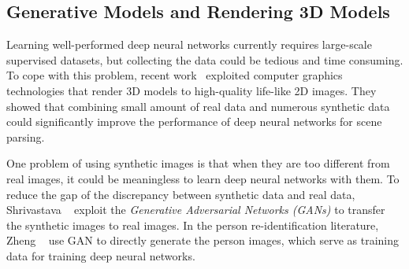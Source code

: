 {\subsection{Generative Models and Rendering 3D Models} %
\label{sub:human-id-generative-models}
Learning well-performed deep neural networks currently requires large-scale supervised datasets, but collecting the data could be tedious and time consuming. To cope with this problem, recent work~\cite{richter2016playing,chen2017photographic} exploited computer graphics technologies that render 3D models to high-quality life-like 2D images. They showed that combining small amount of real data and numerous synthetic data could significantly improve the performance of deep neural networks for scene parsing.

One problem of using synthetic images is that when they are too different from real images, it could be meaningless to learn deep neural networks with them. To reduce the gap of the discrepancy between synthetic data and real data, Shrivastava \etal~\cite{shrivastava2017learning} exploit the \emph{Generative Adversarial Networks (GANs)} to transfer the synthetic images to real images. In the person re-identification literature, Zheng \etal~\cite{zheng2017unlabeled} use GAN to directly generate the person images, which serve as training data for training deep neural networks.}

